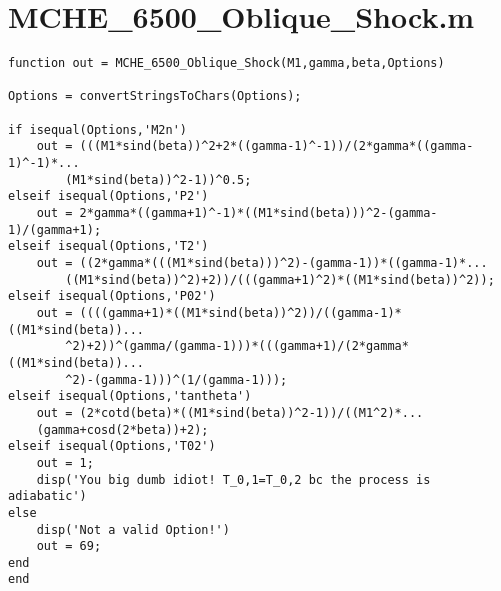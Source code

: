 \documentclass{article}
\begin{document}
\section*{MCHE\_6500\_Oblique\_Shock.m}
\begin{lstlisting}[style=Matlab-editor]
function out = MCHE_6500_Oblique_Shock(M1,gamma,beta,Options)

Options = convertStringsToChars(Options);

if isequal(Options,'M2n')
    out = (((M1*sind(beta))^2+2*((gamma-1)^-1))/(2*gamma*((gamma-1)^-1)*...
        (M1*sind(beta))^2-1))^0.5;
elseif isequal(Options,'P2')
    out = 2*gamma*((gamma+1)^-1)*((M1*sind(beta)))^2-(gamma-1)/(gamma+1);
elseif isequal(Options,'T2')
    out = ((2*gamma*(((M1*sind(beta)))^2)-(gamma-1))*((gamma-1)*...
        ((M1*sind(beta))^2)+2))/(((gamma+1)^2)*((M1*sind(beta))^2));
elseif isequal(Options,'P02')
    out = ((((gamma+1)*((M1*sind(beta))^2))/((gamma-1)*((M1*sind(beta))...
        ^2)+2))^(gamma/(gamma-1)))*(((gamma+1)/(2*gamma*((M1*sind(beta))...
        ^2)-(gamma-1)))^(1/(gamma-1)));
elseif isequal(Options,'tantheta')
    out = (2*cotd(beta)*((M1*sind(beta))^2-1))/((M1^2)*...
    (gamma+cosd(2*beta))+2);
elseif isequal(Options,'T02')
    out = 1;
    disp('You big dumb idiot! T_0,1=T_0,2 bc the process is adiabatic')
else
    disp('Not a valid Option!')
    out = 69;
end
end
\end{lstlisting}
\end{document}
